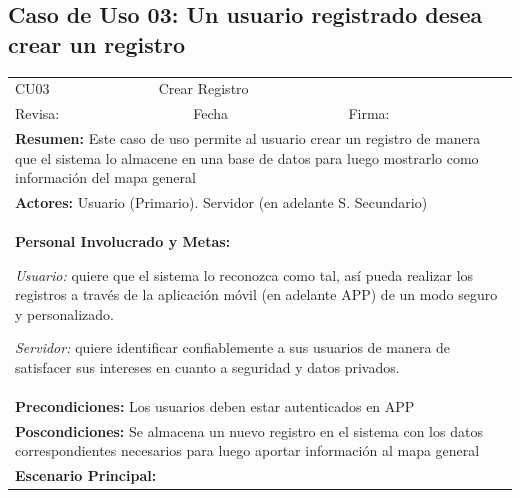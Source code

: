 		\subsection{Caso de Uso 03: Un usuario registrado desea crear un registro}
			\begin{longtable}{|l|p{5.5cm}|l|p{2cm}|l|p{1.9cm}|} \hline
				\cellcolor{grisOscuro} CU03 & \multicolumn{4}{|l|}{  \cellcolor{grisOscuro} Crear Registro} &  \cellcolor{grisClaro}\multirow{2}{1cm}{} \\ \cline{1-5}
				\cellcolor{grisOscuro} Revisa: &  \cellcolor{grisClaro} &  \cellcolor{grisOscuro} Fecha &  \cellcolor{grisClaro} &  \cellcolor{grisOscuro} Firma: & \cellcolor{grisClaro} \\ \hline
				\multicolumn{6}{|p{15cm}|}{ \textbf{Resumen: } Este caso de uso permite al usuario crear un registro de manera que el sistema lo almacene en una base de datos para luego mostrarlo como información del mapa general

				} \\ \hline

				\multicolumn{6}{|p{15cm}|}{ \textbf{Actores: } Usuario (Primario). Servidor (en adelante S. Secundario)

				} \\ \hline

				\multicolumn{6}{|p{15cm}|}{ \textbf{Personal Involucrado y Metas: }

				\emph{Usuario:} quiere que el sistema lo reconozca como tal, así pueda realizar los registros a través de la aplicación móvil (en adelante APP) de un modo seguro y personalizado.

				\emph{Servidor:} quiere identificar confiablemente a sus usuarios de manera de satisfacer sus intereses en cuanto a seguridad y datos privados.

				} \\ \hline

				\multicolumn{6}{|p{15cm}|}{ \textbf{Precondiciones: } Los usuarios deben estar autenticados en APP

				} \\ \hline

				\multicolumn{6}{|p{15cm}|}{ \textbf{Poscondiciones: } Se almacena un nuevo registro en el sistema con los datos correspondientes necesarios para luego aportar información al mapa general

				} \\ \hline

				\multicolumn{6}{|p{15cm}|}{ \textbf{Escenario Principal: }

}
\end{longtable}
